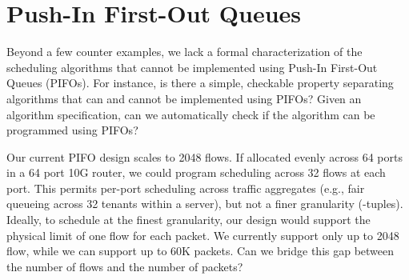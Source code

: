 \section{Push-In First-Out Queues}
\label{sec:pifo_limitations}

Beyond a few counter examples, we lack a formal characterization of the
scheduling algorithms that cannot be implemented using Push-In First-Out Queues
(PIFOs). For instance, is there a simple, checkable property separating
algorithms that can and cannot be implemented using PIFOs? Given an algorithm
specification, can we automatically check if the algorithm can be programmed
using PIFOs?

Our current PIFO design scales to 2048 flows. If allocated evenly across 64
ports in a 64 port 10G router, we could program scheduling across 32 flows at
each port. This permits per-port scheduling across traffic aggregates (e.g.,
fair queueing across 32 tenants within a server), but not a finer granularity
(-tuples). Ideally, to schedule at the finest granularity, our design
would support the physical limit of one flow for each packet. We currently
support only up to 2048 flow, while we can support up to 60K packets. Can we
bridge this gap between the number of flows and the number of packets?

